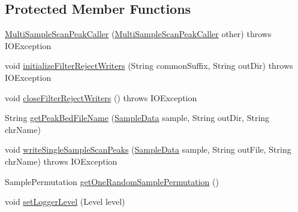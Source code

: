 \subsection*{Protected Member Functions}
\begin{DoxyCompactItemize}
\item 
\hyperlink{classbroad_1_1pda_1_1seq_1_1protection_1_1_multi_sample_scan_peak_caller_ae5fa8ea3c831bfc783a5b19f60fb8346}{Multi\+Sample\+Scan\+Peak\+Caller} (\hyperlink{classbroad_1_1pda_1_1seq_1_1protection_1_1_multi_sample_scan_peak_caller}{Multi\+Sample\+Scan\+Peak\+Caller} other)  throws I\+O\+Exception 
\item 
void \hyperlink{classbroad_1_1pda_1_1seq_1_1protection_1_1_multi_sample_scan_peak_caller_a4ea2fd7e43d91432d95e19b23f31a502}{initialize\+Filter\+Reject\+Writers} (String common\+Suffix, String out\+Dir)  throws I\+O\+Exception 
\item 
void \hyperlink{classbroad_1_1pda_1_1seq_1_1protection_1_1_multi_sample_scan_peak_caller_a85f7d561f66a351adc6a02682ba18685}{close\+Filter\+Reject\+Writers} ()  throws I\+O\+Exception 
\item 
String \hyperlink{classbroad_1_1pda_1_1seq_1_1protection_1_1_multi_sample_scan_peak_caller_afea3110e51be144225c55f1138761a50}{get\+Peak\+Bed\+File\+Name} (\hyperlink{classbroad_1_1pda_1_1seq_1_1protection_1_1_sample_data}{Sample\+Data} sample, String out\+Dir, String chr\+Name)
\item 
void \hyperlink{classbroad_1_1pda_1_1seq_1_1protection_1_1_multi_sample_scan_peak_caller_ae47edcf07d5ed1e49541e32cafcddf01}{write\+Single\+Sample\+Scan\+Peaks} (\hyperlink{classbroad_1_1pda_1_1seq_1_1protection_1_1_sample_data}{Sample\+Data} sample, String out\+File, String chr\+Name)  throws I\+O\+Exception 
\item 
Sample\+Permutation \hyperlink{classbroad_1_1pda_1_1seq_1_1protection_1_1_multi_sample_scan_peak_caller_a513b0bf190da04d2d446f9d76e2f0da6}{get\+One\+Random\+Sample\+Permutation} ()
\item 
void \hyperlink{classbroad_1_1pda_1_1seq_1_1protection_1_1_multi_sample_scan_peak_caller_afca8b084de2774d691172ca3a734e775}{set\+Logger\+Level} (Level level)
\end{DoxyCompactItemize}
